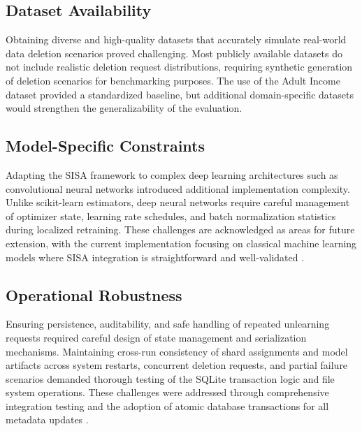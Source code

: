 \subsection{Dataset Availability}
Obtaining diverse and high-quality datasets that accurately simulate real-world data deletion scenarios proved challenging. Most publicly available datasets do not include realistic deletion request distributions, requiring synthetic generation of deletion scenarios for benchmarking purposes. The use of the Adult Income dataset \cite{dua2019uci} provided a standardized baseline, but additional domain-specific datasets would strengthen the generalizability of the evaluation.

\subsection{Model-Specific Constraints}
Adapting the SISA framework to complex deep learning architectures such as convolutional neural networks introduced additional implementation complexity. Unlike scikit-learn estimators, deep neural networks require careful management of optimizer state, learning rate schedules, and batch normalization statistics during localized retraining. These challenges are acknowledged as areas for future extension, with the current implementation focusing on classical machine learning models where SISA integration is straightforward and well-validated \cite{golatkar2020eternal}.

\subsection{Operational Robustness}
Ensuring persistence, auditability, and safe handling of repeated unlearning requests required careful design of state management and serialization mechanisms. Maintaining cross-run consistency of shard assignments and model artifacts across system restarts, concurrent deletion requests, and partial failure scenarios demanded thorough testing of the SQLite transaction logic and file system operations. These challenges were addressed through comprehensive integration testing and the adoption of atomic database transactions for all metadata updates \cite{schelter2021heterogeneous}.

